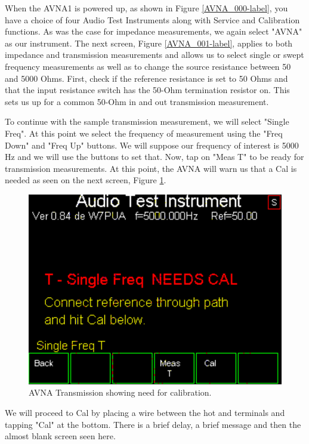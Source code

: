 When the AVNA1 is powered up, as shown in  Figure \ref{AVNA_000-label},  you have a choice of four Audio Test Instruments along with Service and Calibration functions.  As was the case for impedance measurements, we again select "AVNA" as our instrument.  The next screen, Figure  \ref{AVNA_001-label}, applies to both impedance and transmission measurements and allows us to select single or swept frequency measurements as well as to change the source resistance between 50 and 5000 Ohms.  First, check if the reference resistance is set to 50 Ohms and that the input resistance switch has the 50-Ohm termination resistor on.  This sets us up for a common 50-Ohm in and out transmission measurement.

To continue with the sample transmission measurement, we will select "\textsf{Single Freq}".  At this point we select the frequency of measurement using the "\textsf{Freq Down}" and "\textsf{Freq Up}"  buttons.  We will suppose our frequency of interest is 5000 Hz and we will use the buttons to set that.  Now, tap on "\textsf{Meas T}" to be ready for transmission measurements.   At this point, the AVNA will warn us that a Cal is needed as seen on the next screen, Figure  \ref{AVNA_043-label}.
\begin{figure}[H]
\begin{center}
\includegraphics[scale=0.75]{./images/AVNA_043.pdf}
\caption{AVNA Transmission showing need for calibration.}
\label{AVNA_043-label}
\end{center}
\end{figure}
%
We will proceed to Cal by placing a wire between the hot  and  terminals and tapping "\textsf{Cal}" at the bottom.   There is a brief delay, a brief message and then the almost blank screen seen here.
